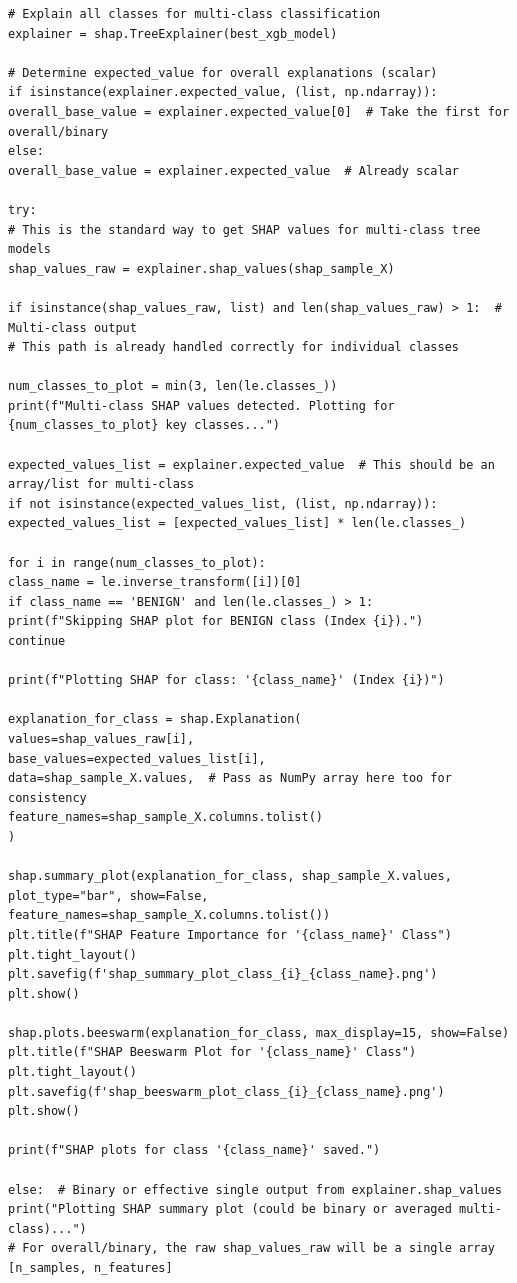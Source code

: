\begin{lstlisting}[caption={Complete pipeline of XGBoost using CIC-IDS2017 in NIDS using Python}, label={lst:python-pipeline}]
# Explain all classes for multi-class classification
explainer = shap.TreeExplainer(best_xgb_model)

# Determine expected_value for overall explanations (scalar)
if isinstance(explainer.expected_value, (list, np.ndarray)):
overall_base_value = explainer.expected_value[0]  # Take the first for overall/binary
else:
overall_base_value = explainer.expected_value  # Already scalar

try:
# This is the standard way to get SHAP values for multi-class tree models
shap_values_raw = explainer.shap_values(shap_sample_X)

if isinstance(shap_values_raw, list) and len(shap_values_raw) > 1:  # Multi-class output
# This path is already handled correctly for individual classes

num_classes_to_plot = min(3, len(le.classes_))
print(f"Multi-class SHAP values detected. Plotting for {num_classes_to_plot} key classes...")

expected_values_list = explainer.expected_value  # This should be an array/list for multi-class
if not isinstance(expected_values_list, (list, np.ndarray)):
expected_values_list = [expected_values_list] * len(le.classes_)

for i in range(num_classes_to_plot):
class_name = le.inverse_transform([i])[0]
if class_name == 'BENIGN' and len(le.classes_) > 1:
print(f"Skipping SHAP plot for BENIGN class (Index {i}).")
continue

print(f"Plotting SHAP for class: '{class_name}' (Index {i})")

explanation_for_class = shap.Explanation(
values=shap_values_raw[i],
base_values=expected_values_list[i],
data=shap_sample_X.values,  # Pass as NumPy array here too for consistency
feature_names=shap_sample_X.columns.tolist()
)

shap.summary_plot(explanation_for_class, shap_sample_X.values, plot_type="bar", show=False,
feature_names=shap_sample_X.columns.tolist())
plt.title(f"SHAP Feature Importance for '{class_name}' Class")
plt.tight_layout()
plt.savefig(f'shap_summary_plot_class_{i}_{class_name}.png')
plt.show()

shap.plots.beeswarm(explanation_for_class, max_display=15, show=False)
plt.title(f"SHAP Beeswarm Plot for '{class_name}' Class")
plt.tight_layout()
plt.savefig(f'shap_beeswarm_plot_class_{i}_{class_name}.png')
plt.show()

print(f"SHAP plots for class '{class_name}' saved.")

else:  # Binary or effective single output from explainer.shap_values
print("Plotting SHAP summary plot (could be binary or averaged multi-class)...")
# For overall/binary, the raw shap_values_raw will be a single array [n_samples, n_features]


\end{lstlisting}
